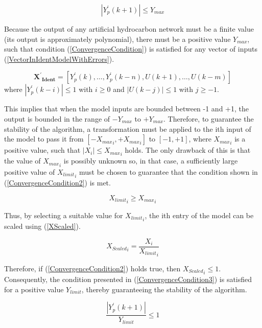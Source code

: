 \documentclass{ieeeaccess}
\begin{document}
\begin{equation}\label{ConvergenceCondition}
\left|Y_p^\prime\left(k+1\right)\right|\le Y_{max}
\end{equation}

Because the output of any artificial hydrocarbon network must be a finite value (its output is approximately polynomial), there must be a positive value \(Y_{max}\), such that condition (\ref{ConvergenceCondition}) is satisfied for any vector of inputs (\ref{VectorInIdentModelWithErrors}).

\begin{equation}\label{VectorInIdentModelWithErrors}
\mathbf{{X^\prime}_{Ident}}=[Y_p^\prime\left(k\right),\ldots,Y_p^\prime\left(k-n\right),U(k+1),\ldots,U(k-m)]
\end{equation}
where \(|Y_p^\prime\left(k-i\right)|\le1\) with \(i\geq0\) and \(\left|U\left(k-j\right)\right|\le1\) with \(j\geq-1\).

This implies that when the model inputs are bounded between -1 and +1, the output is bounded in the range of \({-Y}_{max}\) to \(+Y_{max}\). Therefore, to guarantee the stability of the algorithm, a transformation must be applied to the ith input of the model to pass it from \([-{X_{max}}_i, +{X_{max}}_i]\) to \([-1, +1]\), where \({X_{max}}_i\) is a positive value, such that \(|X_i| \leq {X_{max}}_i\) holds. The only drawback of this is that the value of \({X_{max}}_i\) is possibly unknown so, in that case, a sufficiently large positive value of \({X_{limit}}_i\) must be chosen to guarantee that the condition shown in (\ref{ConvergenceCondition2}) is met.

\begin{equation}\label{ConvergenceCondition2}
{X_{limit}}_i\geq{X_{max}}_i
\end{equation}

Thus, by selecting a suitable value for \({X_{limit}}_i\), the ith entry of the model can be scaled using (\ref{XScaled}).

\begin{equation}\label{XScaled}
{X_{Scaled}}_i=\frac{X_i}{{X_{limit}}_i}
\end{equation}

Therefore, if (\ref{ConvergenceCondition2}) holds true, then \({X_{Scaled}}_i \leq 1\). Consequently, the condition presented in (\ref{ConvergenceCondition3}) is satisfied for a positive value \(Y_{limit}\), thereby guaranteeing the stability of the algorithm.

\begin{equation}\label{ConvergenceCondition3}
\frac{\left|Y_p^\prime\left(k+1\right)\right|}{Y_{limit}}\le1
\end{equation}
\end{document}

